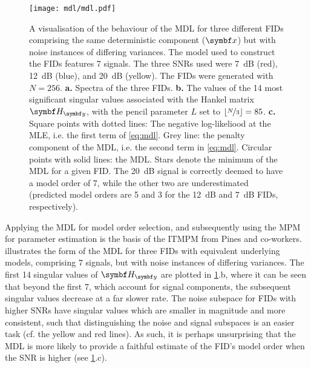 \begin{figure}%
    \centering
    \texttt{[image: mdl/mdl.pdf]}
    \caption[%
        A visualisation of the behaviour of the \acs{MDL} for three different
        \acsp{FID} comprising the same deterministic component, but with
        different noise variances.
    ]{%
        A visualisation of the behaviour of the \acs{MDL} for three different
        \acsp{FID} comprising the same deterministic component ($\bx$) but
        with noise instances of differing variances. The model used
        to construct the \acp{FID} features 7
        signals. The three \acsp{SNR} used were
        \qty{7}{\deci\bel} (red), \qty{12}{\deci\bel} (blue), and
        \qty{20}{\deci\bel} (yellow). The \acsp{FID} were generated with $N
        = 256$.
        \textbf{a.} Spectra of the three \acsp{FID}.
        \textbf{b.} The values of the 14 most significant singular values
        associated with the Hankel matrix $\Hy$, with the
        pencil parameter $L$ set to $\lfloor \nicefrac{N}{3} \rfloor =
        85$.
        \textbf{c.} Square points with dotted lines: The negative log-likeliood
        at the \ac{MLE}, i.e. the first term of \cref{eq:mdl}.
        Grey line: the penalty component of the \ac{MDL}, i.e. the second
        term in \cref{eq:mdl}.
        Circular points with solid lines: the \ac{MDL}.
        Stars denote the minimum of the \ac{MDL} for a given \ac{FID}. The
        \qty{20}{\deci\bel}
        signal is correctly deemed to have a model order of 7, while the other
        two are underestimated (predicted model orders are 5 and 3 for the
        \qty{12}{\deci\bel} and \qty{7}{\deci\bel} \acsp{FID}, respectively).
    }%
    \label{fig:mdl}%
\end{figure}%
Applying the \ac{MDL} for model order selection, and subsequently using the
\ac{MPM} for parameter estimation is the basis of the \ac{ITMPM} from Pines and
co-workers\cite{Lin1997}.
 illustrates the form of the \ac{MDL} for three \acp{FID}
with equivalent underlying models, comprising $7$ signals, but with noise
instances of differing variances. The first 14 singular values of $\Hy$
are plotted in \cref{fig:mdl}.b, where it can be seen that beyond the first 7,
which account for signal components, the subsequent singular values decrease
at a far slower rate. The noise subspace for \acp{FID} with higher \acp{SNR}
have singular values which are smaller in magnitude and more
consistent, such that distinguishing the noise and signal subspaces is an
easier task (cf. the yellow and red lines). As such, it is perhaps
unsurprising that the \ac{MDL} is more likely to provide a faithful estimate of
the \ac{FID}'s model order when the \ac{SNR} is higher (see \cref{fig:mdl}.c).
